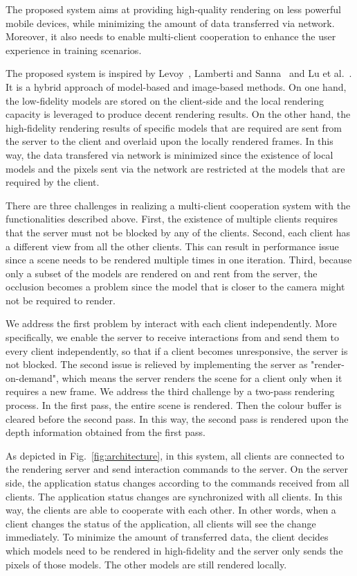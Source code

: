 The proposed system aims at providing high-quality rendering on less powerful mobile devices, while minimizing the amount of data transferred via network.
Moreover, it also needs to enable multi-client cooperation to enhance the user experience in training scenarios.

The proposed system is inspired by Levoy~\cite{levoy1995}, Lamberti and Sanna~\cite{lamberti2007} and Lu et al.~\cite{lu2011}.
It is a hybrid approach of model-based and image-based methods.
On one hand, the low-fidelity models are stored on the client-side and the local rendering capacity is leveraged to produce decent rendering results.
On the other hand, the high-fidelity rendering results of specific models that are required are sent from the server to the client and overlaid upon the locally rendered frames.
In this way, the data transfered via network is minimized since the existence of local models and the pixels sent via the network are restricted at the models that are required by the client.

There are three challenges in realizing a multi-client cooperation system with the functionalities described above.
First, the existence of multiple clients requires that the server must not be blocked by any of the clients.
Second, each client has a different view from all the other clients. This can result in performance issue since a scene needs to be rendered multiple times in one iteration.
Third, because only a subset of the models are rendered on and rent from the server, the occlusion becomes a problem since the model that is closer to the camera might not be required to render.

We address the first problem by interact with each client independently. More specifically, we enable the server to receive interactions from and send them to every client independently, so that if a client becomes unresponsive, the server is not blocked.
The second issue is relieved by implementing the server as "render-on-demand", which means the server renders the scene for a client only when it requires a new frame.
We address the third challenge by a two-pass rendering process. In the first pass, the entire scene is rendered. Then the colour buffer is cleared before the second pass. In this way, the second pass is rendered upon the depth information obtained from the first pass.

As depicted in Fig.~\ref{fig:architecture}, in this system, all clients are connected to the rendering server and send interaction commands to the server.
On the server side, the application status changes according to the commands received from all clients. The application status changes are synchronized with all clients. In this way, the clients are able to cooperate with each other. In other words, when a client changes the status of the application, all clients will see the change immediately.
To minimize the amount of transferred data, the client decides which models need to be rendered in high-fidelity and the server only sends the pixels of those models. The other models are still rendered locally.

